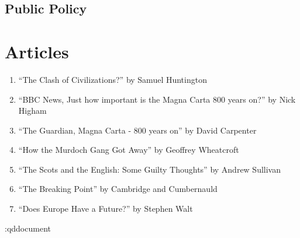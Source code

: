 \documentclass[11 pt, twoside]{article}
\newenvironment{outline*}
{
	\begin{outline}[enumerate]
	}
	{\end{outline}
}
\begin{document}
\begin{outline*}
\begin{outline*}
\end{outline*}
\subsection{Public Policy}
\begin{outline*}

\end{outline*}
\section{Articles}
\begin{enumerate}
\item \hypertarget{1}{``The Clash of Civilizations?'' by Samuel Huntington}
\item \hypertarget{2}{``BBC News, Just how important is the Magna Carta 800 years on?'' by Nick Higham}
\item \hypertarget{3}{``The Guardian, Magna Carta - 800 years on'' by David Carpenter}
\item \hypertarget{4}{``How the Murdoch Gang Got Away'' by Geoffrey Wheatcroft}
\item \hypertarget{5}{``The Scots and the English: Some Guilty Thoughts'' by Andrew Sullivan}
\item \hypertarget{6}{``The Breaking Point'' by Cambridge and Cumbernauld}
\item \hypertarget{7}{``Does Europe Have a Future?'' by Stephen Walt}
\end{enumerate}

\en:qd{document}
\end{document}
